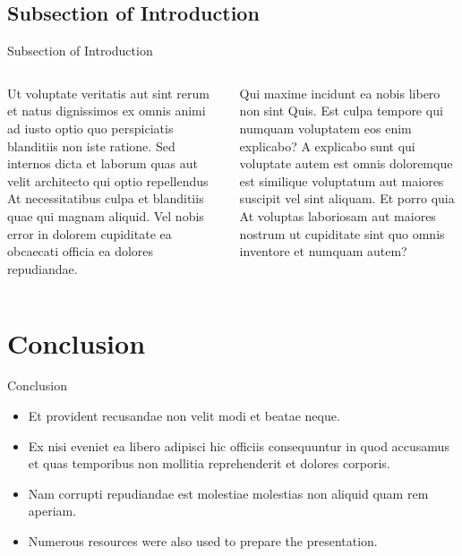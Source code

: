 \documentclass[10t]{beamer}
\begin{document}
\subsection{Subsection of Introduction}

\begin{frame}{Subsection of Introduction}
\begin{columns}
\begin{column}{0.5\textwidth}
Ut voluptate veritatis aut sint rerum et natus dignissimos ex omnis animi ad iusto optio quo perspiciatis blanditiis non iste ratione. Sed internos dicta et laborum quas aut velit architecto qui optio repellendus At necessitatibus culpa et blanditiis quae qui magnam aliquid. Vel nobis error in dolorem cupiditate ea obcaecati officia ea dolores repudiandae.

\end{column}
\begin{column}{0.5\textwidth}
Qui maxime incidunt ea nobis libero non sint Quis. Est culpa tempore qui numquam voluptatem eos enim explicabo? A explicabo sunt qui voluptate autem est omnis doloremque est similique voluptatum aut maiores suscipit vel sint aliquam. Et porro quia At voluptas laboriosam aut maiores nostrum ut cupiditate sint quo omnis inventore et numquam autem?
\end{column}
\end{columns}
\end{frame}


\section{Conclusion}

\begin{frame}{Conclusion}
\begin{block}{}
\begin{itemize}
    \item Et provident recusandae non velit modi et beatae neque.
    \item Ex nisi eveniet ea libero adipisci hic officiis consequuntur in quod accusamus et quas temporibus non mollitia reprehenderit et dolores corporis.
    \item Nam corrupti repudiandae est molestiae molestias non aliquid quam rem aperiam.
    \item Numerous resources were also used to prepare the presentation. \cite{agrawal2020app} \cite{agrawal2012nonlinear} \cite{becker1999erbium} \cite{chkalov_butterfly} \cite{desurvire2002erbium} \cite{digonnet2001rare} \cite{giles1991} \cite{paschotta2010field} \cite{petersen1991} \cite{premaratne_agrawal_2011} \cite{teardownofbutterfly} \cite{thorlabs}
\end{itemize}
\end{block}
\end{frame}
\end{document}
